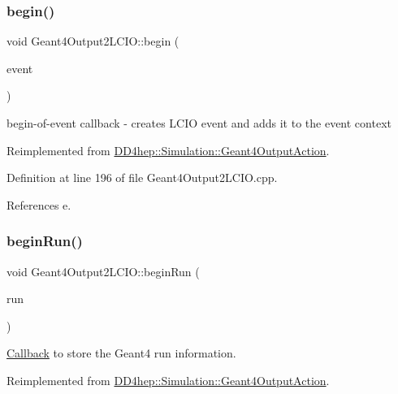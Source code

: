 \subsubsection{\texorpdfstring{begin()}{begin()}}
{\footnotesize\ttfamily void Geant4\+Output2\+L\+C\+I\+O\+::begin (\begin{DoxyParamCaption}\item[{const G4\+Event $\ast$}]{event }\end{DoxyParamCaption})\hspace{0.3cm}{\ttfamily [virtual]}}



begin-\/of-\/event callback -\/ creates L\+C\+IO event and adds it to the event context 



Reimplemented from \hyperlink{class_d_d4hep_1_1_simulation_1_1_geant4_output_action_afaad36616c890ac39e80421d340efd47}{D\+D4hep\+::\+Simulation\+::\+Geant4\+Output\+Action}.



Definition at line 196 of file Geant4\+Output2\+L\+C\+I\+O.\+cpp.



References e.

\hypertarget{class_d_d4hep_1_1_simulation_1_1_geant4_output2_l_c_i_o_aebca66a953f5c24b0098b5066fe4c3fc}{}\label{class_d_d4hep_1_1_simulation_1_1_geant4_output2_l_c_i_o_aebca66a953f5c24b0098b5066fe4c3fc} 
\subsubsection{\texorpdfstring{begin\+Run()}{beginRun()}}
{\footnotesize\ttfamily void Geant4\+Output2\+L\+C\+I\+O\+::begin\+Run (\begin{DoxyParamCaption}\item[{const G4\+Run $\ast$}]{run }\end{DoxyParamCaption})\hspace{0.3cm}{\ttfamily [virtual]}}



\hyperlink{class_d_d4hep_1_1_callback}{Callback} to store the Geant4 run information. 



Reimplemented from \hyperlink{class_d_d4hep_1_1_simulation_1_1_geant4_output_action_afc8b13d72433d8f917555e952e1ce528}{D\+D4hep\+::\+Simulation\+::\+Geant4\+Output\+Action}.



